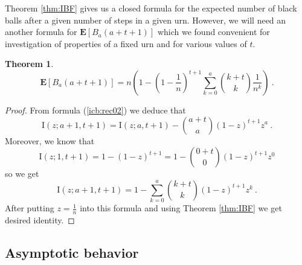 \documentclass[submission]{dmtcs}
\newtheorem{theorem}{Theorem}
\newcommand{\E}[1]{\mathbf{E}\left[#1\right]}
\newcommand{\IBETAREG}[3]{\mathrm{I}\left(#1;#2,#3\right)}
\newcommand{\IBETAREGn}[2]{\mathrm{I}\left(\frac1n;#1,#2\right)}
\begin{document}


Theorem \ref{thm:IBF} gives us a closed formula for the 
expected number of black balls after a given number of steps in a given urn.
However, we will need an another formula for 
$\E{B_{a}(a+t+1)}$ which we found convenient for investigation of 
properties of a fixed urn and for various values of $t$. 

\begin{theorem}
\label{thm:goodformula}
\begin{equation}
\label{eq:ya}
  \E{B_{a}(a+t+1)} =  
  n\left(1- \left(1-\frac{1}{n}\right)^{t+1} \sum_{k=0}^{a} \binom{k+t}{k}\frac{1}{n^k}\right)~.
  \end{equation}
\end{theorem} 

\begin{proof}
From formula (\ref{icb:rec02}) we deduce that
$$
  \IBETAREG{z}{a+1}{t+1} = 
	\IBETAREG{z}{a}{t+1} - \binom{a+t}{a} (1-z)^{t+1} z^a ~.
$$
Moreover, we know that 
$$
\IBETAREG{z}{1}{t+1}  = 1 - (1-z)^{t+1} = 
  1 - \binom{0+t}{0} (1-z)^{t+1} z^0
$$
so we get
$$
  \IBETAREG{z}{a+1}{t+1} = 1 - 
	\sum_{k=0}^{a} \binom{k+t}{k}(1-z)^{t+1}z^k~.
$$
After putting $z= \frac1n$ into this formula and using Theorem \ref{thm:IBF}
we get desired identity.
\end{proof}


\subsection{Asymptotic behavior}
\end{document}
